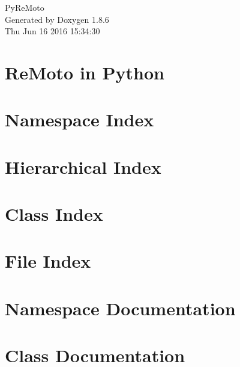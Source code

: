 \documentclass[twoside]{book}
\newcommand{\clearemptydoublepage}{%
  \newpage{\pagestyle{empty}\cleardoublepage}%
}
\begin{document}
\hypersetup{pageanchor=false}
\begin{titlepage}
\vspace*{7cm}
\begin{center}%
{\Large Py\-Re\-Moto }\\
\vspace*{1cm}
{\large Generated by Doxygen 1.8.6}\\
\vspace*{0.5cm}
{\small Thu Jun 16 2016 15:34:30}\\
\end{center}
\end{titlepage}
\clearemptydoublepage
\tableofcontents
\clearemptydoublepage
{}
\hypersetup{pageanchor=true}

\chapter{Re\-Moto in Python}
\label{index}\hypertarget{index}{}
\chapter{Namespace Index}

\chapter{Hierarchical Index}

\chapter{Class Index}

\chapter{File Index}

\chapter{Namespace Documentation}













\chapter{Class Documentation}












\end{document}
